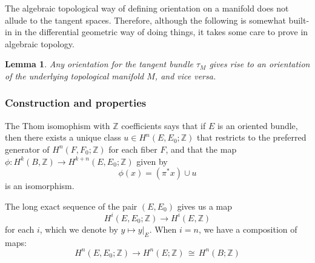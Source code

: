 \documentclass[12pt]{article}
\theoremstyle{plain}
\newtheorem{lemma}[equation]{Lemma}
\theoremstyle{definition}
\newcommand{\IZ}{\mathbb{Z}}
\newcommand\iso{\,{\cong}\,}
\newcommand{\<}{\langle}
\renewcommand{\>}{\rangle}
\begin{document}
The algebraic topological way of defining orientation on a manifold does not allude to the tangent spaces. Therefore, although the following is somewhat built-in in the differential geometric way of doing things, it takes some care to prove in algebraic topology. 
\begin{lemma}
Any orientation for the tangent bundle $\tau_M$ gives rise to an orientation of the underlying topological manifold $M$, and vice versa. 
\end{lemma}

\subsubsection{Construction and properties}
The Thom isomophism with $\IZ$ coefficients says that if $E$ is an oriented bundle, then there exists a unique class $u \in H^n(E, E_0; \IZ)$ that restricts to the preferred generator of $H^n(F, F_0; \IZ)$ for each fiber $F$, and that the map $\phi : H^k(B, \IZ) \to H^{k + n}(E, E_0; \IZ)$ given by 
$$ \phi(x) = (\pi^* x) \cup u$$ is an isomorphism. 

The long exact sequence of the pair $(E, E_0)$ gives us a map 
$$ H^i(E, E_0; \IZ) \to H^i(E, \IZ) $$ for each $i$, which we denote by $y \mapsto y|_E$. When $i = n$, we have a composition of maps: 
$$ H^n(E, E_0; \IZ) \to H^n(E; \IZ) \iso H^n(B; \IZ)$$
\end{document}
